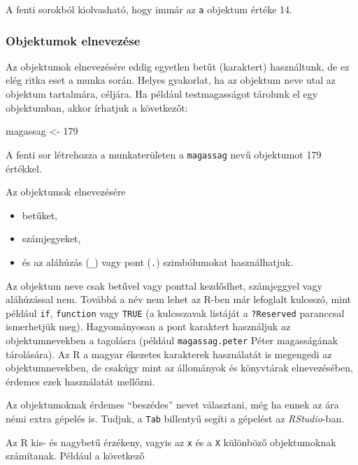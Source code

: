 \documentclass[
]{book}
\newenvironment{Shaded}{\begin{snugshade}}{\end{snugshade}}
\newcommand{\DecValTok}[1]{\textcolor[rgb]{0.00,0.00,0.81}{#1}}
\newcommand{\NormalTok}[1]{#1}
\newcommand{\OtherTok}[1]{\textcolor[rgb]{0.56,0.35,0.01}{#1}}
\providecommand{\tightlist}{%
  \setlength{\itemsep}{0pt}\setlength{\parskip}{0pt}}
\begin{document}
A fenti sorokból kiolvasható, hogy immár az \texttt{a} objektum értéke 14.

\hypertarget{objektumelnevezes}{%
\subsubsection{Objektumok elnevezése}\label{objektumelnevezes}}

Az objektumok elnevezésére eddig egyetlen betűt (karaktert) használtunk, de ez elég ritka eset a munka során. Helyes gyakorlat, ha az objektum neve utal az objektum tartalmára, céljára. Ha például testmagasságot tárolunk el egy objektumban, akkor írhatjuk a következőt:

\begin{Shaded}
\begin{Highlighting}[]
\NormalTok{magassag }\OtherTok{\textless{}{-}} \DecValTok{179}
\end{Highlighting}
\end{Shaded}

A fenti sor létrehozza a munkaterületen a \texttt{magassag} nevű objektumot 179 értékkel.

Az objektumok elnevezésére

\begin{itemize}
\tightlist
\item
  betűket,
\item
  számjegyeket,
\item
  és az aláhúzás (\texttt{\_}) vagy pont (\texttt{.}) szimbólumokat használhatjuk.
\end{itemize}

Az objektum neve csak betűvel vagy ponttal kezdődhet, számjeggyel vagy aláhúzással nem. Továbbá a név nem lehet az R-ben már lefoglalt kulcsszó, mint például \texttt{if}, \texttt{function} vagy \texttt{TRUE} (a kulcsszavak listáját a \texttt{?Reserved} paranccsal ismerhetjük meg). Hagyományosan a pont karaktert használjuk az objektumnevekben a tagolásra (például \texttt{magassag.peter} Péter magasságának tárolására). Az R a magyar ékezetes karakterek használatát is megengedi az objektumnevekben, de csakúgy mint az állományok és könyvtárak elnevezésében, érdemes ezek használatát mellőzni.

Az objektumoknak érdemes ``beszédes'' nevet választani, még ha ennek az ára némi extra gépelés is. Tudjuk, a \texttt{Tab} billentyű segíti a gépelést az \emph{RStudio}-ban.

Az R kis- és nagybetű érzékeny, vagyis az \texttt{x} és a \texttt{X} különböző objektumoknak számítanak. Például a következő
\end{document}
